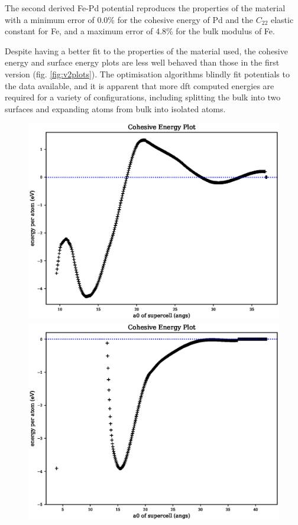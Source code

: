 The second derived Fe-Pd potential reproduces the properties of the material with a minimum error of 0.0\% for the cohesive energy of Pd and the $C_{22}$ elastic constant for Fe, and a maximum error of 4.8\% for the bulk modulus of Fe.

Despite having a better fit to the properties of the material used, the cohesive energy and surface energy plots are less well behaved than those in the first version (fig. \ref{fig:v2plots}).  The optimisation algorithms blindly fit potentials to the data available, and it is apparent that more \acrshort{dft} computed energies are required for a variety of configurations, including splitting the bulk into two surfaces and expanding atoms from bulk into isolated atoms.

\begin{figure}[ht] 
  \centering
  \begin{minipage}[b]{0.4\linewidth}
    \centering
    \includegraphics[width=.98\linewidth]{chapters/results_potential_fitting/pot_fepd_fcc_2/fe_cohesive_energy.eps} 
  \end{minipage}%
  \begin{minipage}[b]{0.4\linewidth}
    \centering
    \includegraphics[width=.98\linewidth]{chapters/results_potential_fitting/pot_fepd_fcc_2/pd_cohesive_energy_zoom.eps} 
  \end{minipage}%


\end{figure}
